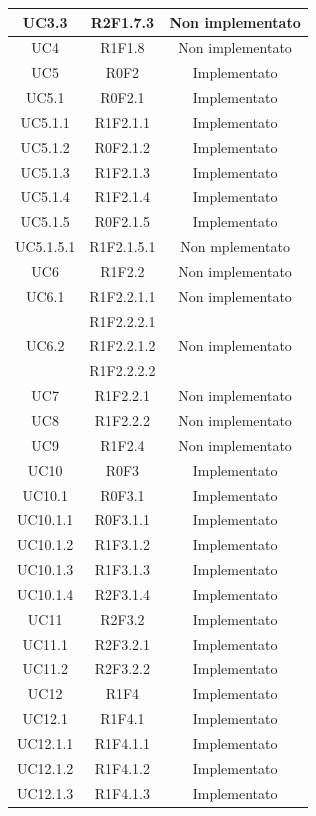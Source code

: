 \begin{longtable}{|c|c|c|}
	\hline
	UC3.3 & R2F1.7.3 & Non implementato\\
	\hline
	UC4 & R1F1.8 & Non implementato\\
	\hline
	UC5 & R0F2 & Implementato\\
	\hline
	UC5.1 & R0F2.1 & Implementato\\
	\hline
	UC5.1.1 & R1F2.1.1 & Implementato\\
	\hline
	UC5.1.2 & R0F2.1.2 & Implementato\\
	\hline
	UC5.1.3 & R1F2.1.3 & Implementato\\
	\hline
	UC5.1.4 & R1F2.1.4 & Implementato\\
	\hline
	UC5.1.5 & R0F2.1.5 & Implementato\\
	\hline
	UC5.1.5.1 & R1F2.1.5.1 & Non mplementato\\
	\hline
	UC6 & R1F2.2 & Non implementato\\
	\hline
	UC6.1 & R1F2.2.1.1 & Non implementato\\
	& R1F2.2.2.1 & \\
	\hline
	\clearpage
	UC6.2 & R1F2.2.1.2 & Non implementato\\
	& R1F2.2.2.2 & \\
	\hline
	UC7 & R1F2.2.1 & Non implementato\\
	\hline
	UC8 & R1F2.2.2 & Non implementato\\
	\hline
	UC9 & R1F2.4 & Non implementato\\
	\hline
	UC10 & R0F3 & Implementato\\
	\hline
	UC10.1 & R0F3.1 & Implementato\\
	\hline
	UC10.1.1 & R0F3.1.1 & Implementato\\
	\hline
	UC10.1.2 & R1F3.1.2 & Implementato\\
	\hline
	UC10.1.3 & R1F3.1.3 & Implementato\\
	\hline
	UC10.1.4 & R2F3.1.4 & Implementato\\
	\hline
	UC11 & R2F3.2 & Implementato\\
	\hline
	UC11.1 & R2F3.2.1 & Implementato\\
	\hline
	UC11.2 & R2F3.2.2 & Implementato\\
	\hline
	UC12 & R1F4 & Implementato\\
	\hline
	UC12.1 & R1F4.1 & Implementato\\
	\hline
	UC12.1.1 & R1F4.1.1 & Implementato\\
	\hline
	UC12.1.2 & R1F4.1.2 & Implementato\\
	\hline
	UC12.1.3 & R1F4.1.3 & Implementato\\

\end{longtable}
